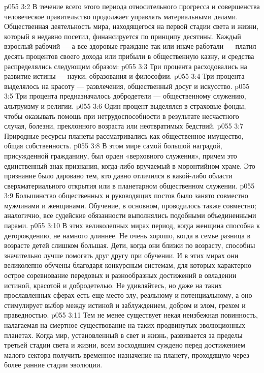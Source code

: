 \vs p055 3:2 \pc В течение всего этого периода относительного прогресса и совершенства человеческое правительство продолжает управлять материальными делами. Общественная деятельность мира, находящегося на первой стадии света и жизни, который я недавно посетил, финансируется по принципу десятины. Каждый взрослый рабочий --- а все здоровые граждане так или иначе работали --- платил десять процентов своего дохода или прибыли в общественную казну, и средства распределялись следующим образом:
\vs p055 3:3 \bibnobreakspace Три процента расходовались на развитие истины --- науки, образования и философии.
\vs p055 3:4 \bibnobreakspace Три процента выделялось на красоту --- развлечения, общественный досуг и искусство.
\vs p055 3:5 \bibnobreakspace Три процента предназначалось добродетели --- общественному служению, альтруизму и религии.
\vs p055 3:6 \bibnobreakspace Один процент выделялся в страховые фонды, чтобы оказывать помощь при нетрудоспособности в результате несчастного случая, болезни, преклонного возраста или неотвратимых бедствий.
\vs p055 3:7 \pc Природные ресурсы планеты рассматривались как общественное имущество, общая собственность.
\vs p055 3:8 В этом мире самой большой наградой, присужденной гражданину, был орден «верховного служения», причем это единственный знак признания, когда\hyp{}либо вручаемый в моронтийном храме. Это признание было даровано тем, кто давно отличился в какой\hyp{}либо области сверхматериального открытия или в планетарном общественном служении.
\vs p055 3:9 Большинство общественных и руководящих постов было занято совместно мужчинами и женщинами. Обучение, в основном, проводилось также совместно; аналогично, все судейские обязанности выполнялись подобными объединенными парами.
\vs p055 3:10 \pc В этих великолепных мирах период, когда женщина способна к деторождению, не намного длиннее. Не очень хорошо, когда в семье разница в возрасте детей слишком большая. Дети, когда они близки по возрасту, способны значительно лучше помогать друг другу при обучении. И в этих мирах они великолепно обучены благодаря конкурсным системам, для которых характерно острое соревнование передовых и разнообразных достижений в овладении истиной, красотой и добродетелью. Не удивляйтесь, но даже на таких прославленных сферах есть еще место злу, реальному и потенциальному, а оно стимулирует выбор между истиной и заблуждением, добром и злом, грехом и праведностью.
\vs p055 3:11 Тем не менее существует некая неизбежная повинность, налагаемая на смертное существование на таких продвинутых эволюционных планетах. Когда мир, установленный в свет и жизнь, развивается за пределы третьей стадии света и жизни, всем восходящим суждено перед достижением малого сектора получить временное назначение на планету, проходящую через более ранние стадии эволюции.
